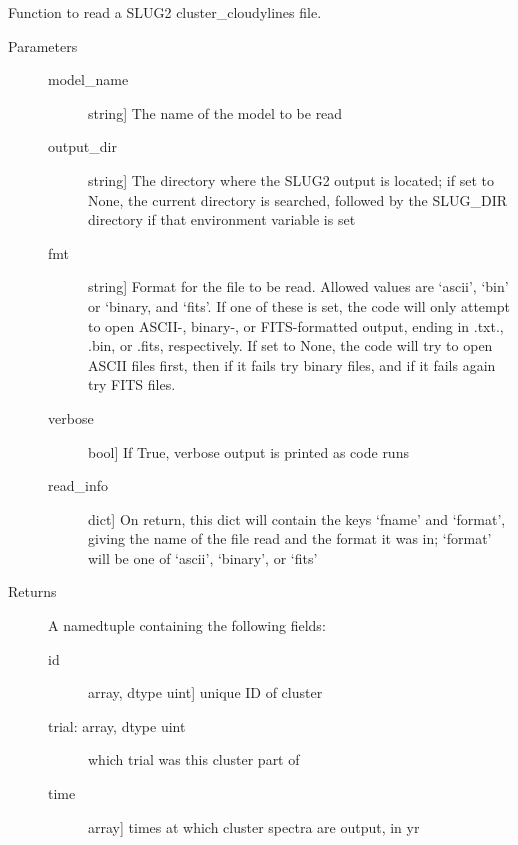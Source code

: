 \documentclass[letterpaper,10pt,english]{sphinxmanual}
\begin{document}
\begin{fulllineitems}
\label{\detokenize{cloudy:slugpy.cloudy.read_cluster_cloudylines}}
Function to read a SLUG2 cluster\_cloudylines file.
\begin{description}
\item[{Parameters}] \leavevmode\begin{description}
\item[{model\_name}] \leavevmode{[}string{]}
The name of the model to be read

\item[{output\_dir}] \leavevmode{[}string{]}
The directory where the SLUG2 output is located; if set to None,
the current directory is searched, followed by the SLUG\_DIR
directory if that environment variable is set

\item[{fmt}] \leavevmode{[}string{]}
Format for the file to be read. Allowed values are ‘ascii’,
‘bin’ or ‘binary, and ‘fits’. If one of these is set, the code
will only attempt to open ASCII-, binary-, or FITS-formatted
output, ending in .txt., .bin, or .fits, respectively. If set
to None, the code will try to open ASCII files first, then if
it fails try binary files, and if it fails again try FITS
files.

\item[{verbose}] \leavevmode{[}bool{]}
If True, verbose output is printed as code runs

\item[{read\_info}] \leavevmode{[}dict{]}
On return, this dict will contain the keys ‘fname’ and
‘format’, giving the name of the file read and the format it
was in; ‘format’ will be one of ‘ascii’, ‘binary’, or ‘fits’

\end{description}

\item[{Returns}] \leavevmode
A namedtuple containing the following fields:
\begin{description}
\item[{id}] \leavevmode{[}array, dtype uint{]}
unique ID of cluster

\item[{trial: array, dtype uint}] \leavevmode
which trial was this cluster part of

\item[{time}] \leavevmode{[}array{]}
times at which cluster spectra are output, in yr


\end{description}
\end{description}
\end{fulllineitems}
\end{document}
